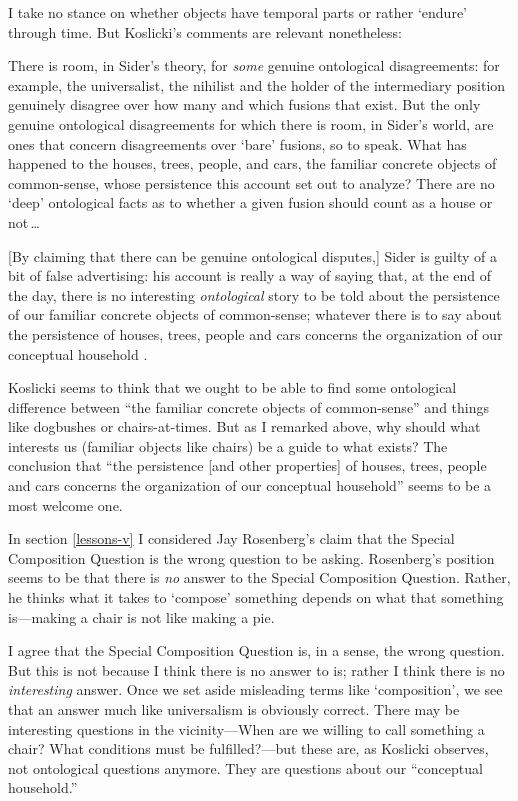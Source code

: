 \documentclass[11pt]{article}
\newenvironment{squote}{%
\begin{spacing}{1}
       	\begin{list}{}{%
\setlength{\labelwidth}{0pt}%
\rightmargin\leftmargin%
}
\item\relax
}{%
\end{list}%
\end{spacing}
}
\begin{document}
\begin{spacing}{1.25}
I take no stance on whether objects have temporal parts or rather
`endure' through time.  But Koslicki's comments are relevant
nonetheless:

\begin{squote}
There is room, in Sider's theory, for {\em some} genuine ontological
disagreements: for example, the universalist, the nihilist and the
holder of the intermediary position genuinely disagree over how many
and which fusions that exist.  But the only genuine ontological
disagreements for which there is room, in Sider's world, are ones that
concern disagreements over `bare' fusions, so to speak.  What has
happened to the houses, trees, people, and cars, the familiar concrete
objects of common-sense, whose persistence this account set out to
analyze?  There are no `deep' ontological facts as to whether a given
fusion should count as a house or not\,\ldots

[By claiming that there can be genuine ontological disputes,] Sider is
guilty of a bit of false advertising: his account is really a way of
saying that, at the end of the day, there is no interesting {\em
  ontological} story to be told about the persistence of our familiar
concrete objects of common-sense; whatever there is to say about the
persistence of houses, trees, people and cars concerns the
organization of our conceptual household
\citeyearpar[124--125]{koslicki2003}.
\end{squote}

Koslicki seems to think that we ought to be able to find some
ontological difference between ``the familiar concrete objects of
common-sense'' and things like dogbushes or chairs-at-times.  But as I
remarked above, why should what interests us (familiar objects like
chairs) be a guide to what exists?  The conclusion that ``the
persistence [and other properties] of houses, trees, people and cars
concerns the organization of our conceptual household'' seems to be a
most welcome one.

In section \ref{lessons-v} I considered Jay Rosenberg's claim that
the Special Composition Question is the wrong question to be asking.
Rosenberg's position seems to be that there is {\em no} answer to the
Special Composition Question.  Rather, he thinks what it takes to
`compose' something depends on what that something is---making a chair
is not like making a pie.

I agree that the Special Composition Question is, in a sense, the
wrong question.  But this is not because I think there is no answer to
is; rather I think there is no {\em interesting} answer.  Once we set
aside misleading terms like `composition', we see that an answer much
like universalism is obviously correct.  There may be interesting
questions in the vicinity---When are we willing to call something a
chair?  What conditions must be fulfilled?---but these are, as
Koslicki observes, not ontological questions anymore.  They are
questions about our ``conceptual household.''


\end{spacing}
\end{document}
